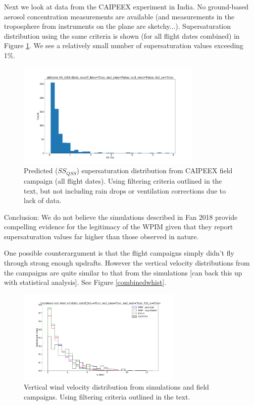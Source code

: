\documentclass{article}
\begin{document}
Next we look at data from the CAIPEEX experiment in India. No ground-based aerosol concentration measurements are available (and measurements in the troposphere from instruments on the plane are sketchy...). Supersaturation distribution using the same criteria is shown (for all flight dates combined) in Figure \ref{caipeexqsshist}. We see a relatively small number of supersaturation values exceeding 1\%.

\begin{figure}[ht]
    \centering
    \includegraphics[width=9cm]{revcaipeex/v10_ss_qss_hist_alldates_figure.png}
    \caption{Predicted ($SS_{QSS}$) supersaturation distribution from CAIPEEX field campaign (all flight dates). Using filtering criteria outlined in the text, but not including rain drops or ventilation corrections due to lack of data.}
    \label{caipeexqsshist}
\end{figure}

Conclusion: We do not believe the simulations described in Fan 2018 provide compelling evidence for the legitimacy of the WPIM given that they report supersaturation values far higher than those observed in nature.

One possible counterargument is that the flight campaigns simply didn't fly through strong enough updrafts. However the vertical velocity distributions from the campaigns are quite similar to that from the simulations [can back this up with statistical analysis]. See Figure \ref{combinedwhist}. 

\begin{figure}[ht]
    \centering
    \includegraphics[width=8cm]{revmywrf/v9_combined_w_hist_figure.png}
    \caption{Vertical wind velocity distribution from simulations and field campaigns. Using filtering criteria outlined in the text.}
    \label{halowhist}
\end{figure}
\end{document}
